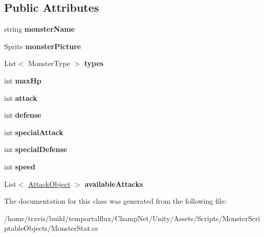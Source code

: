 \subsection*{Public Attributes}
\begin{DoxyCompactItemize}
\item 
\hypertarget{class_monster_stat_ae1f09abad9691a1b0df3b3a3575a64e3}{string {\bfseries monster\-Name}}\label{class_monster_stat_ae1f09abad9691a1b0df3b3a3575a64e3}

\item 
\hypertarget{class_monster_stat_a1699a9350fa5b1b0cece5a0a5fdd112a}{Sprite {\bfseries monster\-Picture}}\label{class_monster_stat_a1699a9350fa5b1b0cece5a0a5fdd112a}

\item 
\hypertarget{class_monster_stat_a01771faf888660584ddf5e134d4da3fb}{List$<$ Monster\-Type $>$ {\bfseries types}}\label{class_monster_stat_a01771faf888660584ddf5e134d4da3fb}

\item 
\hypertarget{class_monster_stat_a3f84d73d947c10926862b904308f01ee}{int {\bfseries max\-Hp}}\label{class_monster_stat_a3f84d73d947c10926862b904308f01ee}

\item 
\hypertarget{class_monster_stat_aa712f00d29d985ecbf192710dd093e42}{int {\bfseries attack}}\label{class_monster_stat_aa712f00d29d985ecbf192710dd093e42}

\item 
\hypertarget{class_monster_stat_adcd2f958be981766592eefec3d7cd7da}{int {\bfseries defense}}\label{class_monster_stat_adcd2f958be981766592eefec3d7cd7da}

\item 
\hypertarget{class_monster_stat_ad1ef4ed9e67df473269df08ba716ce0e}{int {\bfseries special\-Attack}}\label{class_monster_stat_ad1ef4ed9e67df473269df08ba716ce0e}

\item 
\hypertarget{class_monster_stat_a38187f97efd1e52b77340058ecef8198}{int {\bfseries special\-Defense}}\label{class_monster_stat_a38187f97efd1e52b77340058ecef8198}

\item 
\hypertarget{class_monster_stat_a8e1945c1a296695622bada26319ff9e3}{int {\bfseries speed}}\label{class_monster_stat_a8e1945c1a296695622bada26319ff9e3}

\item 
\hypertarget{class_monster_stat_ae5ba7dc95fd5115dfed29cfeaafae51f}{List$<$ \hyperlink{class_attack_object}{Attack\-Object} $>$ {\bfseries available\-Attacks}}\label{class_monster_stat_ae5ba7dc95fd5115dfed29cfeaafae51f}

\end{DoxyCompactItemize}


The documentation for this class was generated from the following file\-:\begin{DoxyCompactItemize}
\item 
/home/travis/build/temportalflux/\-Champ\-Net/\-Unity/\-Assets/\-Scripts/\-Monster\-Scriptable\-Objects/Monster\-Stat.\-cs\end{DoxyCompactItemize}
